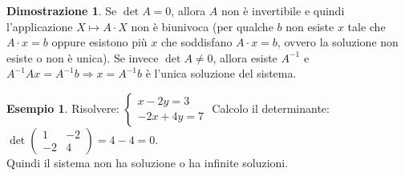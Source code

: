 \documentclass[a4paper]{article}
\theoremstyle{definition}
\newtheorem*{dimm}{Dimostrazione}
\newtheorem*{es}{Esempio}
\begin{document}
	\begin{dimm}
		Se $\det A = 0$, allora $A$ non è invertibile e quindi l'applicazione $X \mapsto A \cdot X$ non è biunivoca
		(per qualche $b$ non esiste $x$ tale che $A \cdot x = b$ oppure esistono più $x$ che soddisfano $A \cdot x = b$, ovvero la soluzione non esiste o non è unica).
		Se invece $\det A \ne 0$, allora esiste $A^{-1}$ e $A^{-1}Ax = A^{-1}b \Rightarrow x = A^{-1}b$ è l'unica soluzione del sistema.
	\end{dimm}
	\begin{es}
		Risolvere: 
		$\begin{cases}
				x - 2y = 3 \\
				-2x + 4y = 7
			\end{cases}$
		Calcolo il determinante: $\det \begin{pmatrix}
			1 & -2 \\
			-2 & 4
		\end{pmatrix} = 4 - 4 = 0$. \\
		Quindi il sistema non ha soluzione o ha infinite soluzioni.
	\end{es}
\end{document}
